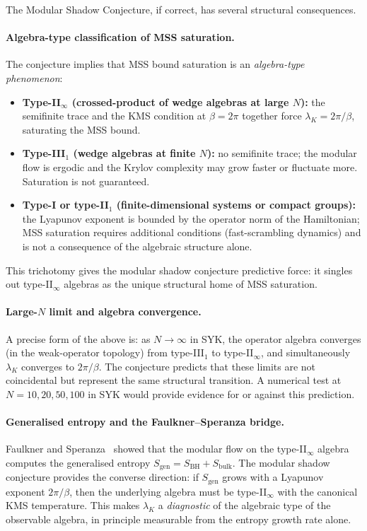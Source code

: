 \documentclass[12pt,a4paper]{article}
\begin{document}
The Modular Shadow Conjecture, if correct, has several structural
consequences.

\paragraph{Algebra-type classification of MSS saturation.}
The conjecture implies that MSS bound saturation is an
\emph{algebra-type phenomenon}:
\begin{itemize}
\item \textbf{Type-II$_\infty$ (crossed-product of wedge algebras at
  large $N$):} the semifinite trace and the KMS condition at $\beta=2\pi$
  together force $\lambda_K = 2\pi/\beta$, saturating the MSS bound.
\item \textbf{Type-III$_1$ (wedge algebras at finite $N$):}
  no semifinite trace; the modular flow is ergodic and the Krylov
  complexity may grow faster or fluctuate more. Saturation is not
  guaranteed.
\item \textbf{Type-I or type-II$_1$ (finite-dimensional systems or
  compact groups):} the Lyapunov exponent is bounded by the operator
  norm of the Hamiltonian; MSS saturation requires additional conditions
  (fast-scrambling dynamics) and is not a consequence of the algebraic
  structure alone.
\end{itemize}
This trichotomy gives the modular shadow conjecture predictive force:
it singles out type-II$_\infty$ algebras as the unique structural home
of MSS saturation.

\paragraph{Large-$N$ limit and algebra convergence.}
A precise form of the above is: as $N \to \infty$ in SYK, the
operator algebra converges (in the weak-operator topology) from
type-III$_1$ to type-II$_\infty$, and simultaneously $\lambda_K$
converges to $2\pi/\beta$.
The conjecture predicts that these limits are not coincidental but
represent the same structural transition.
A numerical test at $N = 10, 20, 50, 100$ in SYK would provide
evidence for or against this prediction.

\paragraph{Generalised entropy and the Faulkner--Speranza bridge.}
Faulkner and Speranza~\cite{FaulknerSperanza2024} showed that the
modular flow on the type-II$_\infty$ algebra computes the generalised
entropy $S_{\mathrm{gen}} = S_{\mathrm{BH}} + S_{\mathrm{bulk}}$.
The modular shadow conjecture provides the converse direction:
if $S_{\mathrm{gen}}$ grows with a Lyapunov exponent $2\pi/\beta$,
then the underlying algebra must be type-II$_\infty$ with the canonical
KMS temperature.
This makes $\lambda_K$ a \emph{diagnostic} of the algebraic type of
the observable algebra, in principle measurable from the entropy growth
rate alone.
\end{document}

